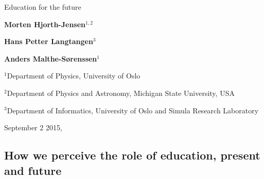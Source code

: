 \documentclass[%
oneside,                 %
final,                   %
10pt]{article}
\begin{document}






\thispagestyle{empty}

\begin{center}
{\LARGE\bf
\begin{spacing}{1.25}
Education for the future
\end{spacing}
}
\end{center}


\begin{center}
{\bf Morten Hjorth-Jensen${}^{1, 2}$} \\ [0mm]
\end{center}


\begin{center}
{\bf Hans Petter Langtangen${}^{3}$} \\ [0mm]
\end{center}


\begin{center}
{\bf Anders Malthe-Sørenssen${}^{1}$} \\ [0mm]
\end{center}

\begin{center}
\centerline{{\small ${}^1$Department of Physics, University of Oslo}}
\centerline{{\small ${}^2$Department of Physics and Astronomy, Michigan State University, USA}}
\centerline{{\small ${}^3$Department of Informatics, University of Oslo and Simula Research Laboratory}}
\end{center}
    

\begin{center} %
September 2 2015, 
\end{center}

\vspace{1cm}


\subsection*{How we perceive the role of education, present and future}

\end{document}
